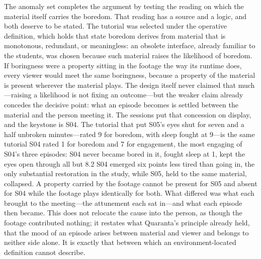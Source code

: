 The anomaly set completes the argument by testing the reading on which the material itself
carries the boredom. That reading has a source and a logic, and both deserve to be stated. The
tutorial was selected under the operative definition, which holds that state boredom derives
from material that is monotonous, redundant, or meaningless: an obsolete interface, already
familiar to the students, was chosen because such material raises the likelihood of boredom.
If boringness were a property sitting in the footage the way its runtime does, every viewer
would meet the same boringness, because a property of the material is present wherever the
material plays. The design itself never claimed that much---raising a likelihood is not
fixing an outcome---but the weaker claim already concedes the decisive point: what an episode
becomes is settled between the material and the person meeting it. The sessions put that
concession on display, and the keystone is S04. The tutorial that put S05's eyes shut for
seven and a half unbroken minutes---rated 9 for boredom, with sleep fought at 9---is the same
tutorial S04 rated 1 for boredom and 7 for engagement, the most engaging of S04's three
episodes: S04 never became bored in it, fought sleep at 1, kept the eyes open through all but
8.2%
S04 emerged six points less tired than going in, the only substantial restoration in the
study, while S05, held to the same material, collapsed. A property carried by the footage
cannot be present for S05 and absent for S04 while the footage plays identically for both.
What differed was what each brought to the meeting---the attunement each sat in---and what
each episode then became. This does not relocate the cause into the person, as though the
footage contributed nothing; it restates what Quaranta's principle already held, that the
mood of an episode arises between material and viewer and belongs to neither side alone. It
is exactly that between which an environment-located definition cannot describe.

